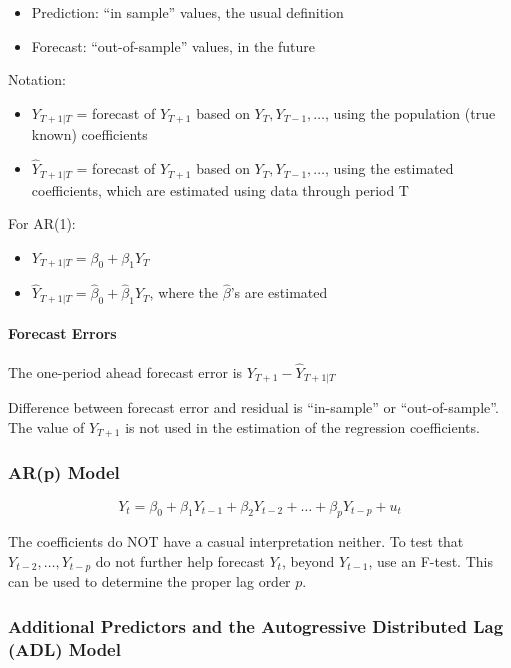 \documentclass{article}
\begin{document}
\begin{itemize}
	\item Prediction: ``in sample'' values, the usual definition
	\item Forecast: ``out-of-sample'' values, in the future
\end{itemize}

Notation\label{notation}:
\begin{itemize}
	\item $Y_{T+1|T}$ = forecast of $Y_{T+1}$ based on $Y_T, Y_{T-1}, \ldots$, using the population (true known) coefficients
	\item $\hat{Y}_{T+1|T}$ = forecast of $Y_{T+1}$ based on $Y_T, Y_{T-1}, \ldots$, using the estimated coefficients,
					which are estimated using data through period T
\end{itemize}

For AR(1):
\begin{itemize}
	\item $Y_{T+1|T} = \beta_0 + \beta_1 Y_T$
	\item $\hat{Y}_{T+1|T} = \hat\beta_0 + \hat\beta_1 Y_T$, where the $\hat\beta$'s are estimated
\end{itemize}

\paragraph{Forecast Errors}

The one-period ahead forecast error is $Y_{T+1} - \hat{Y}_{T+1 | T}$

Difference between forecast error and residual is ``in-sample'' or ``out-of-sample''.
The value of $Y_{T+1}$ is not used in the estimation of the regression coefficients.

\subsubsection{AR(p) Model}

\[
	Y_t = \beta_0 + \beta_1 Y_{t-1} + \beta_2 Y_{t-2} + \ldots + \beta_p Y_{t-p} + u_t
\]

The coefficients do NOT have a casual interpretation neither.
To test that $Y_{t-2}, \ldots, Y_{t-p}$ do not further help forecast $Y_t$, beyond $Y_{t-1}$, use an F-test.
This can be used to determine the proper lag order $p$.

\subsubsection{Additional Predictors and the Autogressive Distributed Lag (ADL) Model}
\end{document}
